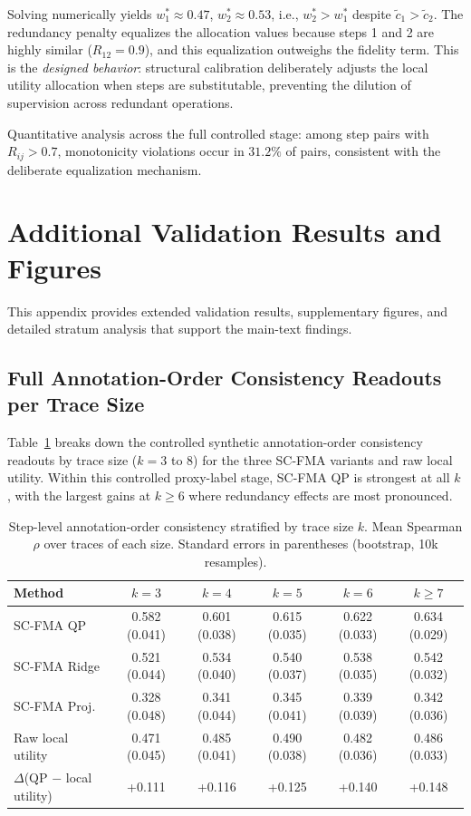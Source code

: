 \documentclass[a4paper,fleqn]{cas-sc}
\begin{document}
Solving numerically yields $w_1^* \approx 0.47$, $w_2^* \approx 0.53$, i.e., $w_2^* > w_1^*$ despite $\tilde{c}_1 > \tilde{c}_2$. The redundancy penalty equalizes the allocation values because steps 1 and 2 are highly similar ($R_{12} = 0.9$), and this equalization outweighs the fidelity term. This is the \emph{designed behavior}: structural calibration deliberately adjusts the local utility allocation when steps are substitutable, preventing the dilution of supervision across redundant operations.

Quantitative analysis across the full controlled stage: among step pairs with $R_{ij} > 0.7$, monotonicity violations occur in $31.2\%$ of pairs, consistent with the deliberate equalization mechanism.

\section{Additional Validation Results and Figures}
\label{app:additional-figures}

This appendix provides extended validation results, supplementary figures, and detailed stratum analysis that support the main-text findings.

\subsection{Full Annotation-Order Consistency Readouts per Trace Size}
\label{app:per-size}

Table~\ref{tab:per-size} breaks down the controlled synthetic annotation-order consistency readouts by trace size ($k = 3$ to $8$) for the three SC-FMA variants and raw local utility. Within this controlled proxy-label stage, SC-FMA QP is strongest at all $k$, with the largest gains at $k \ge 6$ where redundancy effects are most pronounced.

\begin{table}[ht]
\caption{Step-level annotation-order consistency stratified by trace size $k$. Mean Spearman $\rho$ over traces of each size. Standard errors in parentheses (bootstrap, 10k resamples).}
\label{tab:per-size}
\centering
\small
\begin{tabular}{lccccc}
\toprule
\textbf{Method} & $k=3$ & $k=4$ & $k=5$ & $k=6$ & $k \ge 7$ \\
\midrule
SC-FMA QP      & 0.582 (0.041) & 0.601 (0.038) & 0.615 (0.035) & 0.622 (0.033) & 0.634 (0.029) \\
SC-FMA Ridge   & 0.521 (0.044) & 0.534 (0.040) & 0.540 (0.037) & 0.538 (0.035) & 0.542 (0.032) \\
SC-FMA Proj.   & 0.328 (0.048) & 0.341 (0.044) & 0.345 (0.041) & 0.339 (0.039) & 0.342 (0.036) \\
Raw local utility & 0.471 (0.045) & 0.485 (0.041) & 0.490 (0.038) & 0.482 (0.036) & 0.486 (0.033) \\
\midrule
$\Delta$(QP $-$ local utility) & +0.111 & +0.116 & +0.125 & +0.140 & +0.148 \\
\bottomrule
\end{tabular}
\end{table}
\end{document}
